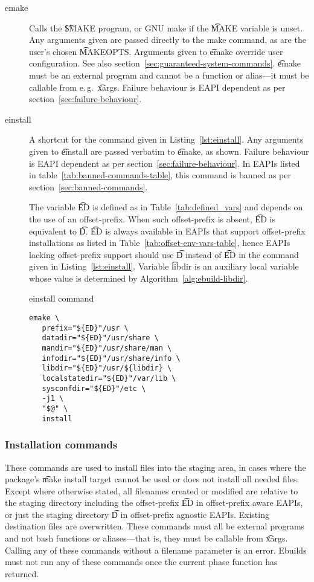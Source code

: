 \begin{description}
\item[emake] Calls the \t{\$MAKE} program, or GNU make if the \t{MAKE} variable is unset.
    Any arguments given are passed directly to the make command, as are the user's chosen
    \t{MAKEOPTS}\@. Arguments given to \t{emake} override user configuration. See also
    section~\ref{sec:guaranteed-system-commands}. \t{emake} must be an external program and cannot
    be a function or alias---it must be callable from e.\,g.\ \t{xargs}. Failure behaviour is EAPI
    dependent as per section~\ref{sec:failure-behaviour}.
\item[einstall] A shortcut for the command given in Listing~\ref{lst:einstall}. Any arguments given
    to \t{einstall} are passed verbatim to \t{emake}, as shown. Failure behaviour is EAPI dependent
    as per section~\ref{sec:failure-behaviour}.
    In EAPIs listed in table~\ref{tab:banned-commands-table}, this command is banned as per
    section~\ref{sec:banned-commands}.

    The variable \t{ED} is defined as in Table~\ref{tab:defined_vars} and depends on the use of an
    offset-prefix. When such offset-prefix is absent, \t{ED} is equivalent to \t{D}\@. \t{ED} is
    always available in EAPIs that support offset-prefix installations as listed in
    Table~\ref{tab:offset-env-vars-table}, hence EAPIs lacking offset-prefix support should use
    \t{D} instead of \t{ED} in the command given in Listing~\ref{lst:einstall}.
    Variable \t{libdir} is an auxiliary local variable whose value is determined by
    Algorithm~\ref{alg:ebuild-libdir}.

\begin{listing}[H]
\caption{einstall command} \label{lst:einstall}
\begin{verbatim}
emake \
   prefix="${ED}"/usr \
   datadir="${ED}"/usr/share \
   mandir="${ED}"/usr/share/man \
   infodir="${ED}"/usr/share/info \
   libdir="${ED}"/usr/${libdir} \
   localstatedir="${ED}"/var/lib \
   sysconfdir="${ED}"/etc \
   -j1 \
   "$@" \
   install
\end{verbatim}
\end{listing}

\end{description}

\subsubsection{Installation commands}
These commands are used to install files into the staging area, in cases where the package's \t{make
install} target cannot be used or does not install all needed files. Except where otherwise stated,
all filenames created or modified are relative to the staging directory including the offset-prefix
\t{ED} in offset-prefix aware EAPIs, or just the staging directory \t{D} in offset-prefix agnostic
EAPIs. Existing destination files are overwritten. These commands must all be external programs and
not bash functions or aliases---that is, they must be callable from \t{xargs}. Calling any of these
commands without a filename parameter is an error. Ebuilds must not run any of these commands once
the current phase function has returned.

